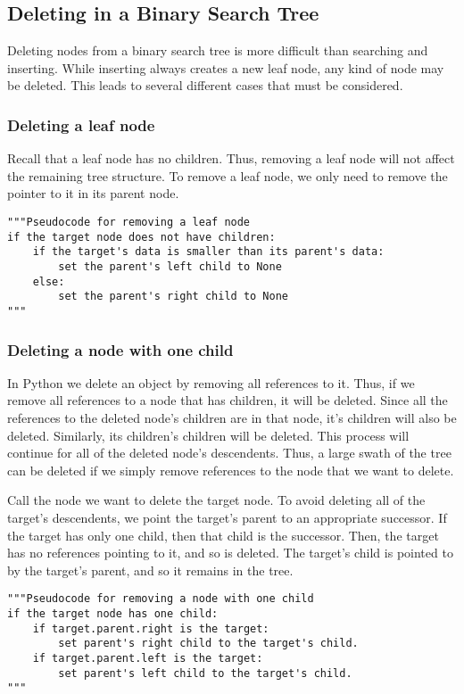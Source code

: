 \subsection*{Deleting in a Binary Search Tree}

Deleting nodes from a binary search tree is more difficult than searching and inserting.
While inserting always creates a new leaf node, any kind of node may be deleted.
This leads to several different cases that must be considered.

\subsubsection*{Deleting a leaf node}

Recall that a leaf node has no children.
Thus, removing a leaf node will not affect the remaining tree structure.
To remove a leaf node, we only need to remove the pointer to it in its parent node.

\begin{lstlisting}
"""Pseudocode for removing a leaf node
if the target node does not have children:
	if the target's data is smaller than its parent's data:
		set the parent's left child to None
	else:
		set the parent's right child to None
"""
\end{lstlisting}

\subsubsection*{Deleting a node with one child}

In Python we delete an object by removing all references to it.
Thus, if we remove all references to a node that has children, it will be deleted.
Since all the references to the deleted node's children are in that node, it's children will also be deleted.
Similarly, its children's children will be deleted.
This process will continue for all of the deleted node's descendents.
Thus, a large swath of the tree can be deleted if we simply remove references to the node that we want to delete.

Call the node we want to delete the target node.
To avoid deleting all of the target's descendents, we point the target's parent to an appropriate successor.
If the target has only one child, then that child is the successor.
Then, the target has no references pointing to it, and so is deleted.
The target's child is pointed to by the target's parent, and so it remains in the tree.

\begin{lstlisting}
"""Pseudocode for removing a node with one child
if the target node has one child:
	if target.parent.right is the target:
		set parent's right child to the target's child.
	if target.parent.left is the target:
		set parent's left child to the target's child.
"""
\end{lstlisting}

